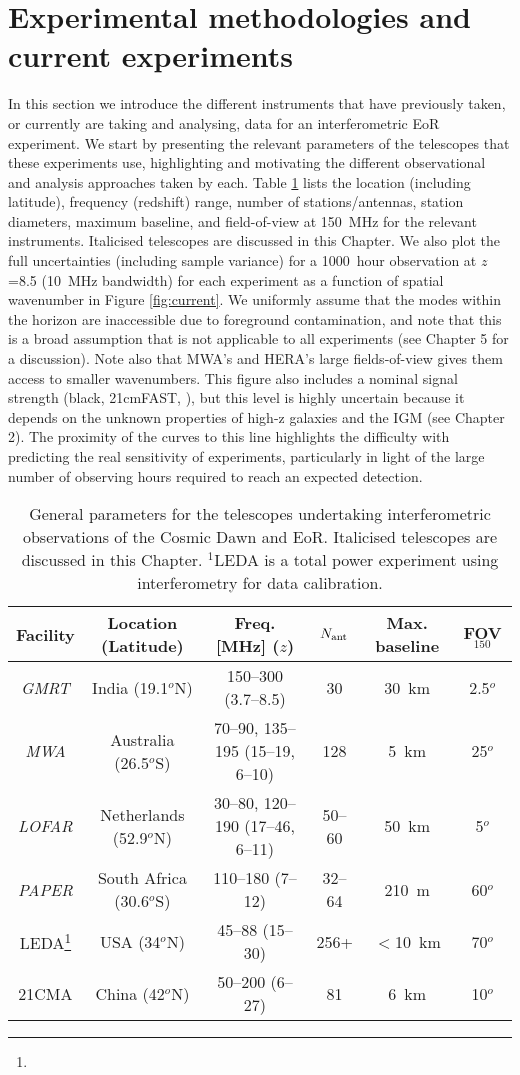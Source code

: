 \section{Experimental methodologies and current experiments}
\label{sec:methodologies}
In this section we introduce the different instruments that have previously taken, or currently are taking and analysing, data for an interferometric EoR experiment. We start by presenting the relevant parameters of the telescopes that these experiments use, highlighting and motivating the different observational and analysis approaches taken by each. Table \ref{table:parameters} lists the location (including latitude), frequency (redshift) range, number of stations/antennas, station diameters, maximum baseline, and field-of-view at 150\, MHz for the relevant instruments. Italicised telescopes are discussed in this Chapter. We also plot the full uncertainties (including sample variance) for a 1000~hour observation at $z$=8.5 (10~MHz bandwidth) for each experiment as a function of spatial wavenumber in Figure \ref{fig:current}. We uniformly assume that the modes within the horizon are inaccessible due to foreground contamination, and note that this is a broad assumption that is not applicable to all experiments (see Chapter 5 for a discussion).
Note also that MWA's and HERA's large fields-of-view gives them access to smaller wavenumbers. This figure also includes a nominal signal strength (black, 21cmFAST, \cite{mesinger11}), but this level is highly uncertain because it depends on the unknown properties of high-z galaxies and the IGM (see Chapter 2). The proximity of the curves to this line highlights the difficulty with predicting the real sensitivity of experiments, particularly in light of the large number of observing hours required to reach an expected detection.
\begin{table}[ht]
\centering
\begin{tabular}{|c||c|c|c|c|c|}
\hline
Facility & Location (Latitude) & Freq. [MHz] ($z$) & $N_{\rm ant}$ & Max. baseline & FOV$_{150}$ \\
\hline
\textit{GMRT} & India (19.1$^{o}$N) & 150--300 (3.7--8.5) & 30 & 30~km & 2.5$^{o}$\\
\textit{MWA} & Australia (26.5$^{o}$S) & 70--90, 135--195 (15--19, 6--10) & 128 & 5~km & 25$^{o}$\\
\textit{LOFAR} & Netherlands (52.9$^{o}$N) & 30--80, 120--190 (17--46, 6--11) & 50--60 & 50~km & 5$^{o}$\\
\textit{PAPER} & South Africa (30.6$^{o}$S) & 110--180 (7--12) & 32--64 & 210~m & 60$^{o}$\\
LEDA\footnote[1]{} & USA (34$^{o}$N) & 45--88 (15--30) & 256+ & $<$10~km & 70$^{o}$\\
21CMA & China (42$^{o}$N) & 50--200 (6--27) & 81 & 6~km & 10$^{o}$\\
\hline \hline
\end{tabular}
\label{table:parameters}
\caption{General parameters for the telescopes undertaking interferometric observations of the Cosmic Dawn and EoR. Italicised telescopes are discussed in this Chapter. $^1$LEDA is a total power experiment using interferometry for data calibration.}
\end{table}
